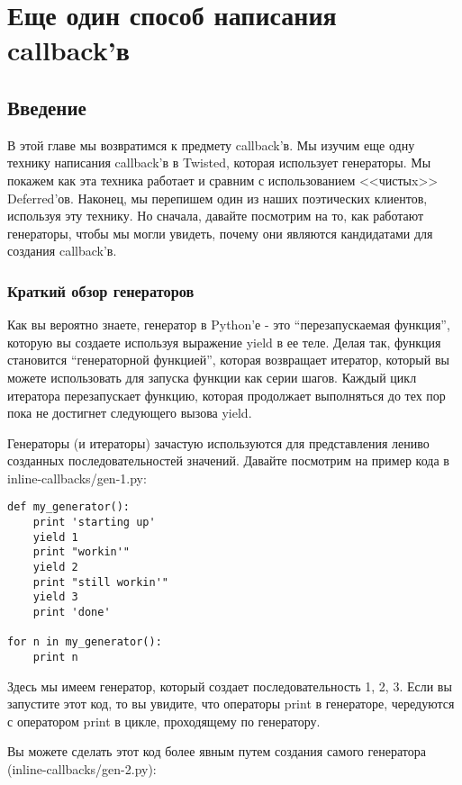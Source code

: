 
\section{Еще один способ написания callback'в\label{sec:part17}}

\subsection{Введение}


В этой главе мы возвратимся к предмету callback'в. Мы изучим 
еще одну технику написания callback'в в Twisted, которая использует 
генераторы. Мы покажем как эта техника работает и сравним с использованием 
<<чистыx>> Deferred'ов. Наконец, мы перепишем один из наших поэтических 
клиентов, используя эту технику. Но сначала, давайте посмотрим на то, 
как работают генераторы, чтобы мы могли увидеть, почему они 
являются кандидатами для создания callback'в.

\subsubsection{Краткий обзор генераторов}

Как вы вероятно знаете, генератор в Python'е - это 
``перезапускаемая функция'', которую вы создаете 
используя выражение yield в ее теле. 
Делая так, функция становится ``генераторной функцией'', 
которая возвращает итератор, который вы можете использовать 
для запуска функции как серии шагов. Каждый цикл 
итератора перезапускает функцию, которая 
продолжает выполняться до тех пор пока не достигнет 
следующего вызова yield.


Генераторы (и итераторы) зачастую используются для представления 
лениво созданных последовательностей значений. Давайте посмотрим 
на пример кода в inline-callbacks/gen-1.py:

 \begin{verbatim}
def my_generator():
    print 'starting up'
    yield 1
    print "workin'"
    yield 2
    print "still workin'"
    yield 3
    print 'done'

for n in my_generator():
    print n
\end{verbatim} 


Здесь мы имеем генератор, который создает последовательность 
1, 2, 3. Если вы запустите этот код, то вы увидите, что операторы print в 
генераторе, чередуются с оператором print в цикле, 
проходящему по генератору.


Вы можете сделать этот код более явным 
путем создания самого генератора (inline-callbacks/gen-2.py):

